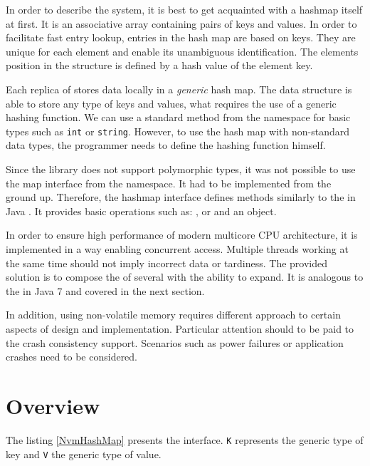     In order to describe the \DHT system, it is best to get acquainted with a hashmap itself at first. 
    It is an associative array containing pairs of keys and values.
    In order to facilitate fast entry lookup, entries in the hash map are based on keys. 
    They are unique for each element and enable its unambiguous identification. 
    The elements position in the structure is defined by a hash value of the element key. 
    
    Each replica of \DHT stores data locally in a \emph{generic} hash map.
    The data structure is able to store any type of keys and values, what requires the use of a generic hashing function. 
    We can use a standard method from the \std namespace for basic types such as \texttt{int} or \texttt{string}. 
    However, to use the hash map with non-standard data types, the programmer needs to define the hashing function himself.
    
    Since the \libpmemobj library does not support polymorphic types, it was not possible to use the map interface from the \std namespace. 
    It had to be implemented from the ground up.
    Therefore, the hashmap interface defines methods similarly to the \HashMap in Java \cite{HashMapJava}. It provides basic operations such as: \insertMethod, \getMethod or \removeMethod and an \Iterator object. 
    
    In order to ensure high performance of modern multicore CPU architecture, it is implemented in a way enabling concurrent access. 
    Multiple threads working at the same time should not imply incorrect data or tardiness. 
    The provided solution is to compose the \NvmHashMap of several \internalHashMaps with the ability to expand.
    It is analogous to the \ConcurrentHashMap in Java 7 \cite{ConcurrentHashMapJava} and covered in the next section.
    
    In addition, using non-volatile memory requires different approach to certain aspects of design and implementation.
    Particular attention should to be paid to the crash consistency support. 
    Scenarios such as power failures or application crashes need to be considered.
    
\section{Overview}

    The listing \ref{NvmHashMap} presents the \NvmHashMap interface. 
    \texttt{K} represents the generic type of key and \texttt{V} the generic type of value. 
    
